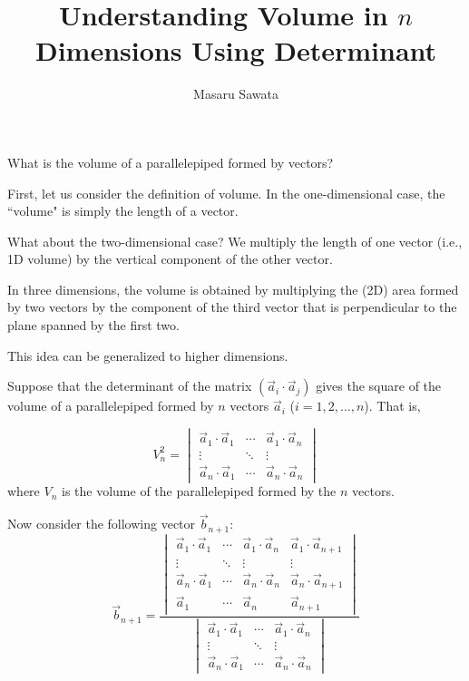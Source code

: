 \documentclass[letterpaper, 12pt]{article}
\title{Understanding Volume in $n$ Dimensions Using Determinant}
\author{Masaru Sawata}
\theoremstyle{custom}
\begin{document}
\maketitle
What is the volume of a parallelepiped formed by vectors?

First, let us consider the definition of volume.
In the one-dimensional case, the ``volume" is simply the length of a vector.

What about the two-dimensional case?
We multiply the length of one vector (i.e., 1D volume) by the vertical component of the other vector.

In three dimensions, the volume is obtained by multiplying the (2D) area formed by two vectors by the component of the third vector that is perpendicular to the plane spanned by the first two.

This idea can be generalized to higher dimensions.

Suppose that the determinant of the matrix $(\vec{a}_i \cdot \vec{a}_j)$ gives the square of the volume of a parallelepiped formed by $n$ vectors $\vec{a}_i$ ($i = 1, 2, \ldots, n$). That is,

\begin{equation*}
  V_n^2 = 
  \begin{vmatrix}
    \vec{a}_1 \cdot \vec{a}_1 & \cdots & \vec{a}_1 \cdot \vec{a}_n \\
    \vdots & \ddots &  \vdots \\
    \vec{a}_n \cdot \vec{a}_1 & \cdots & \vec{a}_n \cdot \vec{a}_n
  \end{vmatrix}
\end{equation*}
where $V_n$ is the volume of the parallelepiped formed by the $n$ vectors.

Now consider the following vector $\vec{b}_{n+1}$:
\begin{equation*}
  \vec{b}_{n+1} = \frac{
    \begin{vmatrix}
    \vec{a}_1 \cdot \vec{a}_1 & \cdots & \vec{a}_1 \cdot \vec{a}_n & \vec{a}_1 \cdot \vec{a}_{n+1} \\
    \vdots & \ddots &  \vdots & \vdots\\
    \vec{a}_n \cdot \vec{a}_1 & \cdots & \vec{a}_n \cdot \vec{a}_n & \vec{a}_n \cdot \vec{a}_{n+1}\\
    \vec{a}_1 & \cdots & \vec{a}_n & \vec{a}_{n+1}
    \end{vmatrix}
  }
  {
  \begin{vmatrix}
    \vec{a}_1 \cdot \vec{a}_1 & \cdots & \vec{a}_1 \cdot \vec{a}_n \\
    \vdots & \ddots &  \vdots \\
    \vec{a}_n \cdot \vec{a}_1 & \cdots & \vec{a}_n \cdot \vec{a}_n
  \end{vmatrix}
  }
\end{equation*}
\end{document}

